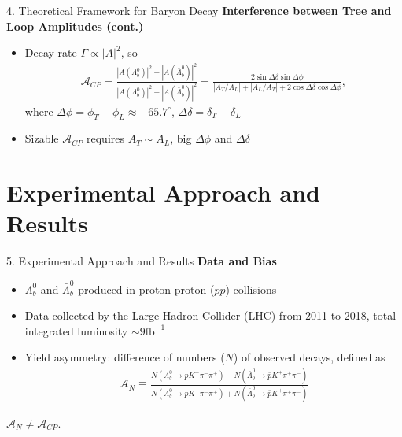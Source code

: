 \documentclass[xcolor=dvipsnames]{beamer}
\def\d{\delta}
\def\D{\Delta}
\def\Ld{\Lambda}
\begin{document}
\begin{frame}{4. Theoretical Framework for Baryon Decay}
\textbf{Interference between Tree and Loop Amplitudes (cont.)}\\
\begin{itemize}
    \item Decay rate $\Gamma\propto |A|^{2}$, so
    \begin{align*}
        \mathcal{A}_{CP}=\frac{|A(\Ld_{b}^{0})|^{2}-|A(\bar{\Ld}_{b}^{0})|^{2}}{|A(\Ld_{b}^{0})|^{2}+|A(\bar{\Ld}_{b}^{0})|^{2}}=\frac{2\sin\D\d\sin\D\phi}{|A_{T}/A_{L}|+|A_{L}/A_{T}|+2\cos\D\d\cos\D\phi},
    \end{align*}
    where $\D\phi=\phi_{T}-\phi_{L}\approx -65.7^\circ$, $\D\d=\d_{T}-\d_{L}$
    \item Sizable $\mathcal{A}_{CP}$ requires $A_{T}\sim A_{L}$, big $\D\phi$ and $\D\d$
\end{itemize}
\end{frame}

\section{Experimental Approach and Results}
\begin{frame}{5. Experimental Approach and Results}
\textbf{Data and Bias}\\
\begin{itemize}
    \item $\Ld_{b}^{0}$ and $\bar{\Ld}_{b}^{0}$ produced in proton-proton ($pp$) collisions
    \item Data collected by the Large Hadron Collider (LHC) from 2011 to 2018, total integrated luminosity $\sim 9\mathrm{fb}^{-1}$
    \item Yield asymmetry: difference of numbers ($N$) of observed decays, defined as
    \begin{align*}
        \mathcal{A}_{N}\equiv\frac{N(\Ld_{b}^{0}\to p K^{-}\pi^{-}\pi^{+})-N(\bar{\Ld}_{b}^{0}\to \bar{p}K^{+}\pi^{+}\pi^{-})}{N(\Ld_{b}^{0}\to p K^{-}\pi^{-}\pi^{+})+N(\bar{\Ld}_{b}^{0}\to \bar{p}K^{+}\pi^{+}\pi^{-})}
    \end{align*}
\end{itemize}
$\mathcal{A}_{N}\neq\mathcal{A}_{CP}$.
\end{frame}
\end{document}
